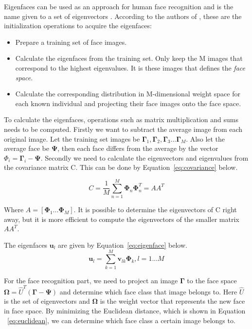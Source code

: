 Eigenfaces can be used as an approach for human face recognition and is the name given to a set of eigenvectors \cite{eigenface1}. According to the authors of \cite{eigenface2}, these are the initialization operations to acquire the eigenfaces: 

\begin{itemize}
  \item Prepare a training set of face images.
  \item Calculate the eigenfaces from the training set. Only keep the M images that correspond to the highest eigenvalues. It is these images that defines the \emph{face space}.
  \item Calculate the corresponding distribution in M-dimensional weight space for each known individual and projecting their face images onto the face space. 
\end{itemize}

To calculate the eigenfaces, operations such as matrix multiplication and sums needs to be computed. Firstly we want to subtract the average image from each original image. Let the training set images be $\mathbf{\Gamma}_1,\mathbf{\Gamma}_2,\mathbf{\Gamma}_3...\mathbf{\Gamma}_M $. Also let the average face be $\mathbf{\Psi} $, then each face differs from the average by the vector $\Phi_i=\mathbf{\Gamma}_i - \mathbf{\Psi} $. Secondly we need to calculate the eigenvectors and eigenvalues from the covariance matrix C. This can be done by Equation~\ref{eq:covariance} below. 

\begin{equation}
C = \frac{1}{M}\sum_{n=1}^{M} \mathbf{\Phi}_n \mathbf{\Phi}_n^T = AA^T
\label{eq:covariance}
\end{equation}

Where $A=[\mathbf{\Phi}_1... \mathbf{\Phi}_M]. $ 
	It is possible to determine the eigenvectors of C right away, but it is more efficient to compute the eigenvectors of the smaller matrix $ AA^T $.

The eigenfaces $\mathbf{u}_l $ are given by Equation~\ref{eq:eigenface} below.
\begin{equation}
\mathbf{u}_l = \sum_{k=1}^{M} \mathbf{v}_{lk} \mathbf{\Phi}_k,          l=1...M
\label{eq:eigenface}
\end{equation}
	
	For the face recognition part, we need to project an image $\mathbf{\Gamma} $ to the face space $\mathbf{\Omega} = \widehat{U}^T(\mathbf{\Gamma} - \mathbf{\Psi}) $ and determine which face class that image belongs to. Here $\widehat{U}$ is the set of eigenvectors and $\mathbf{\Omega}$ is the weight vector that represents the new face in face space. By minimizing the Euclidean distance, which is shown in Equation ~\ref{eq:euclidean}, we can determine which face class a certain image belongs to.
	
